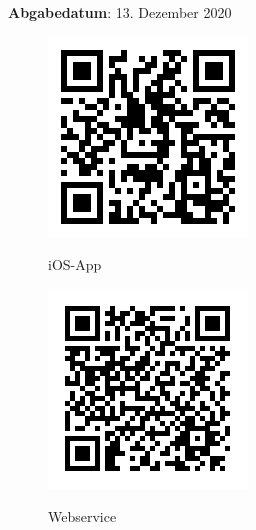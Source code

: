 \documentclass[12pt,titlepage]{article}
\begin{document}
\begin{center}
\begin{large}
\textbf{Abgabedatum}: 13. Dezember 2020 \\ 
\begin{figure}[ht]
  \centering
  \begin{minipage}[t][][b]{0.2\textwidth}
  \href{https://github.com/NicoIseli/IOS_App_Project}{\includegraphics[width=\textwidth]{Img/iosappqrcode.png}}
    \caption*{iOS-App}
  \end{minipage}
  \hfill
  \begin{minipage}[t][][b]{0.2\textwidth}
    \href{https://gitlab.enterpriselab.ch/foodprint/foodprint-backend-distribution}{\includegraphics[width=\textwidth]{Img/backendqrcode.png}}
    \caption*{Webservice}
  \end{minipage}
\end{figure}
\end{large}
\end{center}
\end{document}
